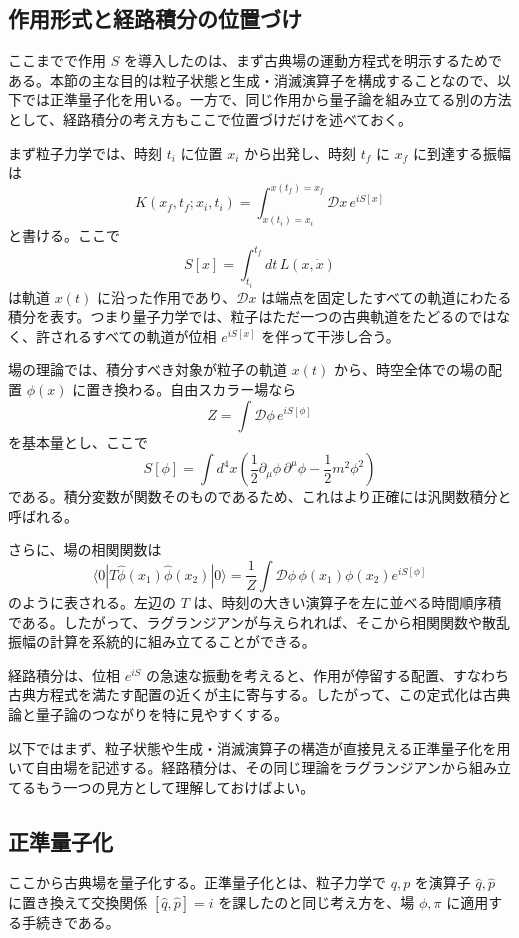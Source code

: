 \subsection{作用形式と経路積分の位置づけ}
ここまでで作用 $S$ を導入したのは、まず古典場の運動方程式を明示するためである。本節の主な目的は粒子状態と生成・消滅演算子を構成することなので、以下では正準量子化を用いる。一方で、同じ作用から量子論を組み立てる別の方法として、経路積分の考え方もここで位置づけだけを述べておく。

まず粒子力学では、時刻 $t_i$ に位置 $x_i$ から出発し、時刻 $t_f$ に $x_f$ に到達する振幅は
\[
K(x_f,t_f;x_i,t_i)
=
\int_{x(t_i)=x_i}^{x(t_f)=x_f} \mathcal{D}x \, e^{iS[x]}
\]
と書ける。ここで
\[
S[x]=\int_{t_i}^{t_f} dt\, L(x,\dot{x})
\]
は軌道 $x(t)$ に沿った作用であり、$\mathcal{D}x$ は端点を固定したすべての軌道にわたる積分を表す。つまり量子力学では、粒子はただ一つの古典軌道をたどるのではなく、許されるすべての軌道が位相 $e^{iS[x]}$ を伴って干渉し合う。

場の理論では、積分すべき対象が粒子の軌道 $x(t)$ から、時空全体での場の配置 $\phi(x)$ に置き換わる。自由スカラー場なら
\[
Z = \int \mathcal{D}\phi\, e^{iS[\phi]}
\]
を基本量とし、ここで
\[
S[\phi]=\int d^4x \left(
\frac{1}{2}\partial_\mu \phi \, \partial^\mu \phi - \frac{1}{2}m^2\phi^2
\right)
\]
である。積分変数が関数そのものであるため、これはより正確には汎関数積分と呼ばれる。

さらに、場の相関関数は
\[
\langle 0|T\hat{\phi}(x_1)\hat{\phi}(x_2)|0\rangle
=
\frac{1}{Z}\int \mathcal{D}\phi\, \phi(x_1)\phi(x_2)e^{iS[\phi]}
\]
のように表される。左辺の $T$ は、時刻の大きい演算子を左に並べる時間順序積である。したがって、ラグランジアンが与えられれば、そこから相関関数や散乱振幅の計算を系統的に組み立てることができる。

経路積分は、位相 $e^{iS}$ の急速な振動を考えると、作用が停留する配置、すなわち古典方程式を満たす配置の近くが主に寄与する。したがって、この定式化は古典論と量子論のつながりを特に見やすくする。

以下ではまず、粒子状態や生成・消滅演算子の構造が直接見える正準量子化を用いて自由場を記述する。経路積分は、その同じ理論をラグランジアンから組み立てるもう一つの見方として理解しておけばよい。

\subsection{正準量子化}
ここから古典場を量子化する。正準量子化とは、粒子力学で $q,p$ を演算子 $\hat{q},\hat{p}$ に置き換えて交換関係 $[\hat{q},\hat{p}] = i$ を課したのと同じ考え方を、場 $\phi,\pi$ に適用する手続きである。

